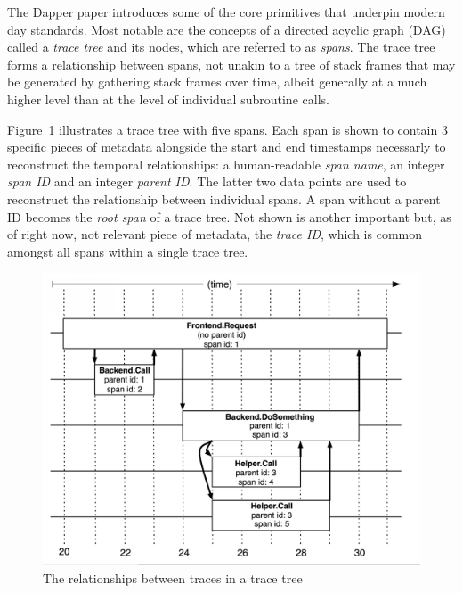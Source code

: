 \documentclass[pdftex,titlepage]{article}
\begin{document}
        The Dapper paper introduces some of the core primitives that underpin modern day standards. Most notable are the concepts
        of a directed acyclic graph (DAG) called a \textit{trace tree} and its nodes, which are referred to as \textit{spans}. 
        The trace tree forms a relationship between spans, not unakin to a tree of stack frames that may be generated by
        gathering stack frames over time, albeit generally at a much higher level than at the level of individual subroutine calls. 

        Figure~\ref{fig:dappertrace} illustrates a trace tree with five spans. Each span is shown to contain 3 specific pieces of
        metadata alongside the start and end timestamps necessarly to reconstruct the temporal relationships: a human-readable
        \textit{span name}, an integer \textit{span ID} and an integer \textit{parent ID}. The latter two
        data points are used to reconstruct the relationship between individual spans. A span without a parent ID becomes the 
        \textit{root span} of a trace tree. Not shown is another important but, as of right now, not relevant piece of metadata, the 
        \textit{trace ID}, which is common amongst all spans within a single trace tree.

        \begin{figure}[htb!]
            \centering
            \includegraphics[scale=1]{dappertrace}
            \caption{The relationships between traces in a trace tree}
            \label{fig:dappertrace}
        \end{figure}
\end{document}
